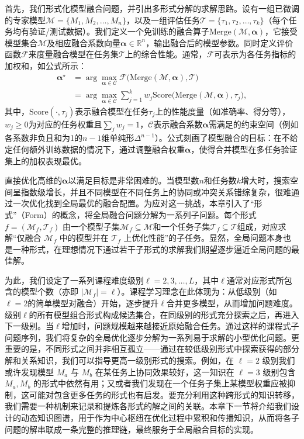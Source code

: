 \documentclass[../main.tex]{subfiles}
\begin{document}
首先，我们形式化模型融合问题，并引出多形式分解的求解思路。设有一组已微调的专家模型$\mathcal{M}=\{M_{1}, M_{2}, \ldots, M_{n}\}$，以及一组评估任务$\mathcal{T}=\{\tau_{1}, \tau_{2}, \ldots, \tau_{k}\}$（每个任务均有验证/测试数据）。我们定义一个免训练的融合算子$\mathrm{Merge}(\mathcal{M}, \boldsymbol{\alpha})$，它接受模型集合$\mathcal{M}$及相应融合系数向量$\boldsymbol{\alpha}\in \mathbb{R}^n$，输出融合后的模型参数。同时定义评价函数$\mathcal{F}$来度量融合模型在任务集$\mathcal{T}$上的综合性能。通常，$\mathcal{F}$可表示为各任务指标的加权和，如公式所示：
\begin{equation}
	\begin{aligned}
		\boldsymbol{\alpha}^{\star} & = \arg\max_{\boldsymbol{\alpha}\in\mathcal{C}} \mathcal{F}\Big(\mathrm{Merge}(\mathcal{M},\boldsymbol{\alpha}), \mathcal{T}\Big)                 \\
		{}                          & = \arg\max_{\boldsymbol{\alpha}\in\mathcal{C}} \sum_{j=1}^{k} w_j \text{Score}\Big(\mathrm{Merge}(\mathcal{M},\boldsymbol{\alpha}), \tau_j\Big),
	\end{aligned}
\end{equation}
其中，$\text{Score}(\cdot,\tau_j)$表示融合模型在任务$\tau_j$上的性能度量（如准确率、得分等），$w_j \ge 0$为对应的任务权重且$\sum_{j}w_j=1$，$\mathcal{C}$表示融合系数$\boldsymbol{\alpha}$需满足的约束空间（例如各系数非负且和为1的$n-1$维单纯形$\Delta^{n-1}$）。公式刻画了模型融合的目标：在不给定任何额外训练数据的情况下，通过调整融合权重$\boldsymbol{\alpha}$，使得合并模型在多任务验证集上的加权表现最优。

直接优化高维的$\boldsymbol{\alpha}$以满足目标是非常困难的。当模型数$n$和任务数$k$增大时，搜索空间呈指数级增长，并且不同模型在不同任务上的协同或冲突关系错综复杂，很难通过一次优化找到全局最优的融合配置。为应对这一挑战，本章引入了“形式”（Form）的概念，将全局融合问题分解为一系列子问题。每个形式 $f=(\mathcal{M}_f,\mathcal{T}_f)$ 由一个模型子集$\mathcal{M}_f \subseteq \mathcal{M}$和一个任务子集$\mathcal{T}_f \subseteq \mathcal{T}$组成，对应求解“仅融合 $\mathcal{M}_f$ 中的模型并在 $\mathcal{T}_f$ 上优化性能”的子任务。显然，全局问题本身也是一种形式，在理想情况下通过若干子形式的求解我们期望逐步逼近全局问题的最佳解。

为此，我们设定了一系列课程难度级别$\ell=2,3,\ldots,L$，其中$\ell$通常对应形式所包含的模型个数（亦即 $|\mathcal{M}_f|=\ell$）。课程学习理念在此体现为：从低级别（如$\ell=2$的简单模型对融合）开始，逐步提升$\ell$合并更多模型，从而增加问题难度。级别$\ell$的所有模型组合形式构成候选集合，在同级别的形式充分探索之后，再进入下一级别。当$\ell$增加时，问题规模越来越接近原始融合任务。通过这样的课程式子问题序列，我们将复杂的全局优化逐步分解为一系列易于求解的小型优化问题。更重要的是，不同形式之间并非相互孤立——通过在较低级别形式中探索获得的部分解和关系知识，我们可以指导更高一级别形式的搜索。例如，在 $\ell=2$ 级别我们或许发现模型 $M_a$ 与 $M_b$ 在某任务上协同效果较好，这一知识在 $\ell=3$ 级别包含 $M_a, M_b$ 的形式中依然有用；又或者我们发现在一个任务子集上某模型权重应被抑制，这可能对包含更多任务的形式也有启发。要充分利用这种跨形式的知识转移，我们需要一种机制来记录和提炼各形式的解之间的关联。本章下一节将介绍我们设计的动态知识图谱，用于作为中心枢纽在优化过程中累积和传播知识，从而将各子问题的解串联成一条完整的推理链，最终服务于全局融合目标的实现。
\end{document}
